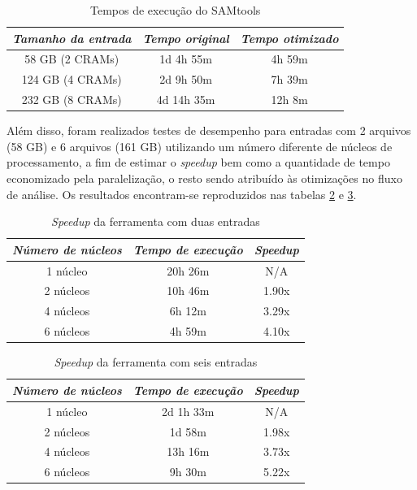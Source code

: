 \documentclass[cic,tc]{iiufrgs}
\begin{document}
\begin{table}[h]
    \caption{Tempos de execução do SAMtools}
    \centering
        \begin{tabular}{c|c|c}
          \hline
          \textit{Tamanho da entrada}  &   \textit{Tempo original}  & \textit{Tempo otimizado} \\
          \hline
          \hline
          58 GB (2 CRAMs) & 1d 4h 55m & 4h 59m \\
          124 GB (4 CRAMs) & 2d 9h 50m & 7h 39m \\
          232 GB (8 CRAMs) & 4d 14h 35m & 12h 8m \\
          \hline
        \end{tabular}
    \label{tbl:SAMtools}
\end{table}

Além disso, foram realizados testes de desempenho para entradas com 2 arquivos
(58 GB) e 6 arquivos (161 GB) utilizando um número diferente de núcleos de
processamento, a fim de estimar o \textit{speedup} bem como a quantidade de
tempo economizado pela paralelização, o resto sendo atribuído às otimizações no
fluxo de análise. Os resultados encontram-se reproduzidos nas tabelas
\ref{tbl:speedup2} e \ref{tbl:speedup6}.

\begin{table}[h]
    \caption{\textit{Speedup} da ferramenta com duas entradas}
    \centering
        \begin{tabular}{c|c|c}
          \hline
          \textit{Número de núcleos}  &   \textit{Tempo de execução}  & \textit{Speedup} \\
          \hline
          \hline
          1 núcleo & 20h 26m & N/A \\
          2 núcleos & 10h 46m & 1.90x \\
          4 núcleos & 6h 12m & 3.29x \\
          6 núcleos & 4h 59m & 4.10x \\
          \hline
        \end{tabular}
    \label{tbl:speedup2}
\end{table}

\begin{table}[h]
    \caption{\textit{Speedup} da ferramenta com seis entradas}
    \centering
        \begin{tabular}{c|c|c}
          \hline
          \textit{Número de núcleos}  &   \textit{Tempo de execução}  & \textit{Speedup} \\
          \hline
          \hline
          1 núcleo & 2d 1h 33m & N/A \\
          2 núcleos & 1d 58m & 1.98x \\
          4 núcleos & 13h 16m & 3.73x \\
          6 núcleos & 9h 30m & 5.22x \\
          \hline
        \end{tabular}
    \label{tbl:speedup6}
\end{table}
\end{document}
